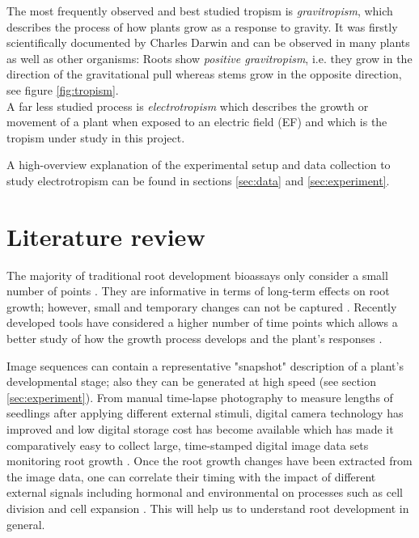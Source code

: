 The most frequently observed and best studied tropism is \textit{gravitropism}, which describes the process of how plants grow as a response to gravity. It was firstly scientifically documented by Charles Darwin \cite{nick2017} and can be observed in many plants as well as other organisms: Roots show \textit{positive gravitropism}, i.e. they grow in the direction of the gravitational pull whereas stems grow in the opposite direction, see figure \ref{fig:tropism}. 
\\
A far less studied process is \textit{electrotropism} which describes the growth or movement of a plant when exposed to an electric field (EF) and which is the tropism under study in this project. 

A high-overview explanation of the experimental setup and data collection to study electrotropism can be found in sections \ref{sec:data} and \ref{sec:experiment}.

\section{Literature review}

The majority of traditional root development bioassays only consider a small number of points \cite{parry2001novel,french2009high}. They are informative in terms of long-term effects on root growth; however, small and temporary changes can not be captured \cite{parry2001novel}.
Recently developed tools have considered a higher number of time points which allows a better study of how the growth process develops and the plant's responses \cite{french2009high,ishikawa1997novel,van2003new,chavarria2008spatio,miller2007computer}.

Image sequences can contain a representative "snapshot" description of a plant's developmental stage; also they can be generated at high speed (see section \ref{sec:experiment}). From manual time-lapse photography \cite{van1934einfluss,michener1938action} to measure lengths of seedlings after applying different external stimuli, digital camera  technology has improved and low digital storage cost has become available which has made it comparatively easy to collect large, time-stamped digital image data sets monitoring root growth \cite{french2009high}.
Once the root growth changes have been extracted from the image data, one can correlate their timing with the impact of different external signals including hormonal and environmental on processes such as cell division and cell expansion \cite{french2009high}. This will help us to understand root development in general. 

